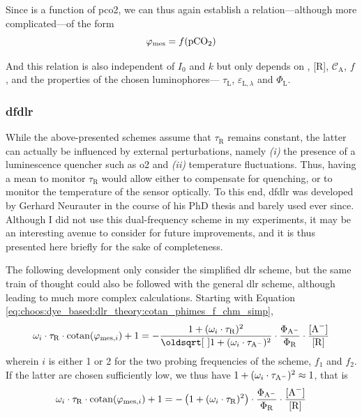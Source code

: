 Since \ce{[A^-]} is a function of \gls{pco2}, we can thus again establish a relation---although more complicated---of the form
\begin{equation}
	\varphi_\text{mes} = f(\ce{pCO_2})
\end{equation}

And this relation is also independent of $I_0$ and $k$ but only depends on \ce{[Q^+]}, [R], $\mathcal{C}_\mathrm{A}$, $f$, and the properties of the chosen luminophores---\ie{} $\tau_\mathrm{L}$, $\varepsilon_{\mathrm{L}, \lambda}$ and $\Phi_\mathrm{L}$.

\subsubsection{\texorpdfstring{\gls{dfdlr}}{Dual Frequency DLR}}\label{subsect:choos:dye_based:dlr_theory:dfdlr}

While the above-presented schemes assume that $\tau_\mathrm{R}$ remains constant, the latter can actually be influenced by external perturbations, namely \emph{(i)} the presence of a luminescence quencher such as \gls{o2} and \emph{(ii)} temperature fluctuations\cite{lam2011}. Thus, having a mean to monitor $\tau_\mathrm{R}$ would allow either to compensate for quenching, or to monitor the temperature of the sensor optically. To this end, \gls{dfdlr} was developed by Gerhard Neurauter in the course of his PhD thesis\cite{neurauter2000_phd} and barely used ever since\cite{borisov2006, kocincova2007, borisov2011}. Although I did not use this dual-frequency scheme in my experiments, it may be an interesting avenue to consider for future improvements, and it is thus presented here briefly for the sake of completeness.

The following development only consider the simplified \gls{dlr} scheme, but the same train of thought could also be followed with the general \gls{dlr} scheme, although leading to much more complex calculations. Starting with Equation \ref{eq:choos:dye_based:dlr_theory:cotan_phimes_f_chm_simp},
\begin{equation}
	\omega_i \cdot \tau_\mathrm{R} \cdot \cotan(\varphi_{\text{mes}, i}) + 1 = - \frac{1 + (\omega_i \cdot \tau_\mathrm{R})^2}{\sqrt{1 + (\omega_i \cdot \tau_\mathrm{A\spminus})^2}}\cdot \frac{\Phi_\mathrm{A\spminus}}{\Phi_\mathrm{R}}\cdot \frac{\ce{[A^-]}}{\ce{[R]}}
\end{equation}
wherein $i$ is either 1 or 2 for the two probing frequencies of the scheme, $f_1$ and $f_2$. If the latter are chosen sufficiently low, we thus have $1 + (\omega_i \cdot \tau_\mathrm{A^{\smash{-}}})^2 \approx 1$, that is
\begin{equation}
	\omega_i \cdot \tau_\mathrm{R} \cdot \cotan(\varphi_{\text{mes}, i}) + 1 = - \left(1 + (\omega_i \cdot \tau_\mathrm{R})^2 \right) \cdot \frac{\Phi_\mathrm{A\spminus}}{\Phi_\mathrm{R}}\cdot \frac{\ce{[A^-]}}{\ce{[R]}}
\end{equation}

